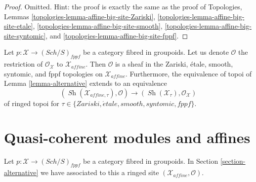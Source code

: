 \documentclass{stacks-project}
\theoremstyle{plain}
\theoremstyle{definition}
\theoremstyle{remark}
\numberwithin{equation}{subsection}
\def\Sch{\mathit{Sch}}
\def\Sh{\mathop{\mathit{Sh}}\nolimits}
\def\etale{{\acute{e}tale}}
\begin{document}
\begin{proof}
Omitted. Hint: the proof is exactly the same as the proof of
Topologies, Lemmas
\ref{topologies-lemma-affine-big-site-Zariski},
\ref{topologies-lemma-affine-big-site-etale},
\ref{topologies-lemma-affine-big-site-smooth},
\ref{topologies-lemma-affine-big-site-syntomic}, and
\ref{topologies-lemma-affine-big-site-fppf}.
\end{proof}

\noindent
Let $p : \mathcal{X} \to (\Sch/S)_{fppf}$ be a category fibred in groupoids.
Let us denote $\mathcal{O}$ the restriction of $\mathcal{O}_\mathcal{X}$
to $\mathcal{X}_{affine}$. Then $\mathcal{O}$ is a sheaf in the
Zariski, \'etale, smooth, syntomic, and fppf topologies on
$\mathcal{X}_{affine}$. Furthermore, the equivalence of topoi of
Lemma \ref{lemma-alternative} extends to an equivalence
\begin{equation}
\label{equation-alternative-ringed}
(\Sh(\mathcal{X}_{affine, \tau}), \mathcal{O})
\longrightarrow
(\Sh(\mathcal{X}_\tau), \mathcal{O}_\mathcal{X})
\end{equation}
of ringed topoi for $\tau \in \{Zariski, \etale, smooth, syntomic, fppf\}$.









\section{Quasi-coherent modules and affines}
\label{section-alternative-quasi-coherent}

\noindent
Let $p : \mathcal{X} \to (\Sch/S)_{fppf}$ be a category fibred in groupoids.
In Section \ref{section-alternative} we have associated to this a ringed site
$(\mathcal{X}_{affine}, \mathcal{O})$.
\end{document}
